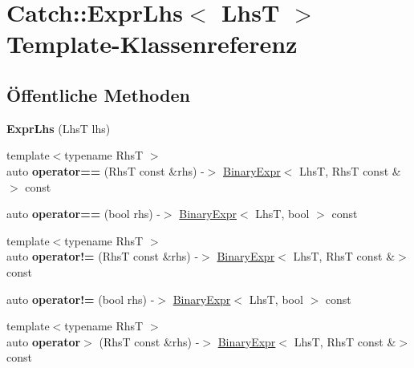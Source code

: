 \hypertarget{classCatch_1_1ExprLhs}{}\section{Catch\+:\+:Expr\+Lhs$<$ LhsT $>$ Template-\/\+Klassenreferenz}
\label{classCatch_1_1ExprLhs}
\subsection*{Öffentliche Methoden}
\begin{DoxyCompactItemize}
\item 
\mbox{\label{classCatch_1_1ExprLhs_ad22c6af1a7d6993240624d299714a479}} 
{\bfseries Expr\+Lhs} (LhsT lhs)
\item 
\mbox{\label{classCatch_1_1ExprLhs_a3068adff1dbbaeec62ffc368d4d6cc4d}} 
{\footnotesize template$<$typename RhsT $>$ }\\auto {\bfseries operator==} (RhsT const \&rhs) -\/$>$ \hyperlink{classCatch_1_1BinaryExpr}{Binary\+Expr}$<$ LhsT, RhsT const \&$>$ const
\item 
\mbox{\label{classCatch_1_1ExprLhs_ab707a84abdffbdc35962a495e238d393}} 
auto {\bfseries operator==} (bool rhs) -\/$>$ \hyperlink{classCatch_1_1BinaryExpr}{Binary\+Expr}$<$ LhsT, bool $>$ const
\item 
\mbox{\label{classCatch_1_1ExprLhs_a5e10eab8aed53dd000b89d8fd7754437}} 
{\footnotesize template$<$typename RhsT $>$ }\\auto {\bfseries operator!=} (RhsT const \&rhs) -\/$>$ \hyperlink{classCatch_1_1BinaryExpr}{Binary\+Expr}$<$ LhsT, RhsT const \&$>$ const
\item 
\mbox{\label{classCatch_1_1ExprLhs_a60eca847201d057d8a8b7222c69b619c}} 
auto {\bfseries operator!=} (bool rhs) -\/$>$ \hyperlink{classCatch_1_1BinaryExpr}{Binary\+Expr}$<$ LhsT, bool $>$ const
\item 
\mbox{\label{classCatch_1_1ExprLhs_a23cb0cd983a1ac9c3df5160542199b83}} 
{\footnotesize template$<$typename RhsT $>$ }\\auto {\bfseries operator$>$} (RhsT const \&rhs) -\/$>$ \hyperlink{classCatch_1_1BinaryExpr}{Binary\+Expr}$<$ LhsT, RhsT const \&$>$ const

\end{DoxyCompactItemize}
